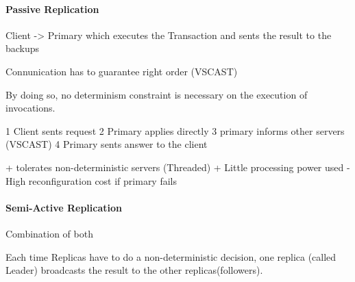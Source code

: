 \documentclass[a4paper,12pt]{article}%
\begin{document}
 
 \paragraph{Passive Replication}
 Client -> Primary which executes the Transaction and sents the result to the backups
 
  Connunication has to guarantee right order (VSCAST)
 
 By
doing so, no determinism constraint is necessary on the execution of
invocations.

1 Client sents request
2 Primary applies directly
3 primary informs other servers (VSCAST)
4 Primary sents answer to the client

+ tolerates non-deterministic servers (Threaded)
+ Little processing power used
- High reconfiguration cost if primary fails

 \paragraph{Semi-Active Replication}
Combination of both

Each time Replicas have to do a non-deterministic decision, one replica (called Leader) broadcasts the result to the other replicas(followers).
 
 
 
 
 
 
 
 
 
 
 
 
 
 
 
\end{document}
